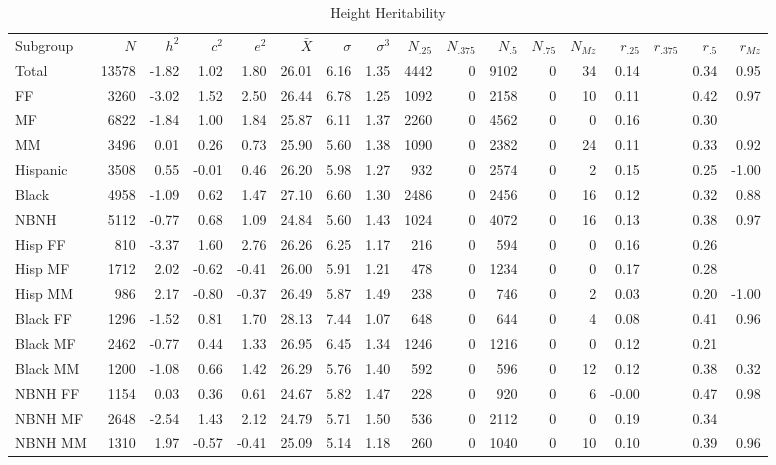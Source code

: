 \documentclass[a4paper]{article}
\begin{document}
\begin{table}[ht]
\begin{center}
\begin{tabular}{lr|rrr|rrr|rrrrr|rrrr}
 Subgroup & $N$ & $h^2$ & $c^2$ & $e^2$ & $\bar{X}$ & $\sigma$ & $\sigma^3$ & $N_{.25}$ & $N_{.375}$ & $N_{.5}$ & $N_{.75}$ & $N_{Mz}$ & $r_{.25}$ & $r_{.375}$ & $r_{.5}$ & $r_{Mz}$ \\ 
 Total & 13578 & -1.82 & 1.02 & 1.80 & 26.01 & 6.16 & 1.35 & 4442 & 0 & 9102 & 0 & 34 & 0.14 &  & 0.34 & 0.95 \\ 
   \hline
FF & 3260 & -3.02 & 1.52 & 2.50 & 26.44 & 6.78 & 1.25 & 1092 & 0 & 2158 & 0 & 10 & 0.11 &  & 0.42 & 0.97 \\ 
  MF & 6822 & -1.84 & 1.00 & 1.84 & 25.87 & 6.11 & 1.37 & 2260 & 0 & 4562 & 0 & 0 & 0.16 &  & 0.30 &  \\ 
  MM & 3496 & 0.01 & 0.26 & 0.73 & 25.90 & 5.60 & 1.38 & 1090 & 0 & 2382 & 0 & 24 & 0.11 &  & 0.33 & 0.92 \\ 
   \hline
Hispanic & 3508 & 0.55 & -0.01 & 0.46 & 26.20 & 5.98 & 1.27 & 932 & 0 & 2574 & 0 & 2 & 0.15 &  & 0.25 & -1.00 \\ 
  Black & 4958 & -1.09 & 0.62 & 1.47 & 27.10 & 6.60 & 1.30 & 2486 & 0 & 2456 & 0 & 16 & 0.12 &  & 0.32 & 0.88 \\ 
  NBNH & 5112 & -0.77 & 0.68 & 1.09 & 24.84 & 5.60 & 1.43 & 1024 & 0 & 4072 & 0 & 16 & 0.13 &  & 0.38 & 0.97 \\ 
   \hline
Hisp FF & 810 & -3.37 & 1.60 & 2.76 & 26.26 & 6.25 & 1.17 & 216 & 0 & 594 & 0 & 0 & 0.16 &  & 0.26 &  \\ 
  Hisp MF & 1712 & 2.02 & -0.62 & -0.41 & 26.00 & 5.91 & 1.21 & 478 & 0 & 1234 & 0 & 0 & 0.17 &  & 0.28 &  \\ 
  Hisp MM & 986 & 2.17 & -0.80 & -0.37 & 26.49 & 5.87 & 1.49 & 238 & 0 & 746 & 0 & 2 & 0.03 &  & 0.20 & -1.00 \\ 
   \hline
Black FF & 1296 & -1.52 & 0.81 & 1.70 & 28.13 & 7.44 & 1.07 & 648 & 0 & 644 & 0 & 4 & 0.08 &  & 0.41 & 0.96 \\ 
  Black MF & 2462 & -0.77 & 0.44 & 1.33 & 26.95 & 6.45 & 1.34 & 1246 & 0 & 1216 & 0 & 0 & 0.12 &  & 0.21 &  \\ 
  Black MM & 1200 & -1.08 & 0.66 & 1.42 & 26.29 & 5.76 & 1.40 & 592 & 0 & 596 & 0 & 12 & 0.12 &  & 0.38 & 0.32 \\ 
   \hline
NBNH FF & 1154 & 0.03 & 0.36 & 0.61 & 24.67 & 5.82 & 1.47 & 228 & 0 & 920 & 0 & 6 & -0.00 &  & 0.47 & 0.98 \\ 
  NBNH MF & 2648 & -2.54 & 1.43 & 2.12 & 24.79 & 5.71 & 1.50 & 536 & 0 & 2112 & 0 & 0 & 0.19 &  & 0.34 &  \\ 
  NBNH MM & 1310 & 1.97 & -0.57 & -0.41 & 25.09 & 5.14 & 1.18 & 260 & 0 & 1040 & 0 & 10 & 0.10 &  & 0.39 & 0.96 \\ 
  \end{tabular}
\caption{Height Heritability}
\label{tab:two}
\end{center}
\end{table}%
\end{document}
